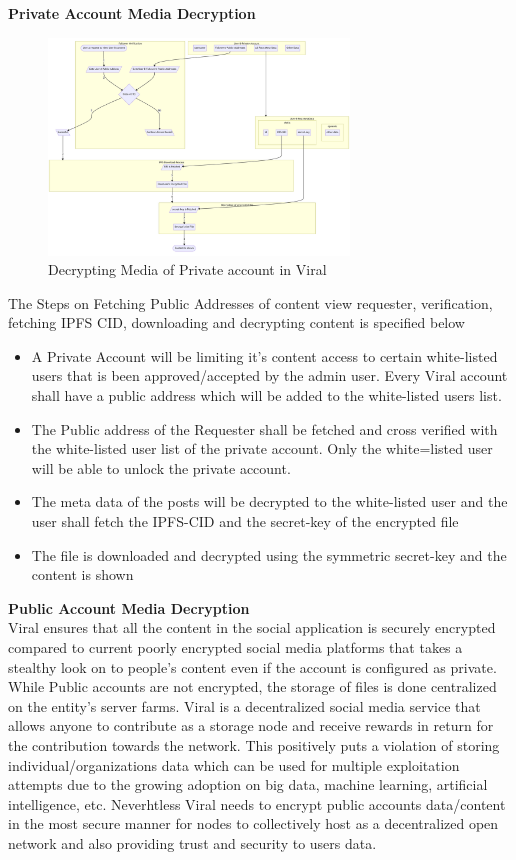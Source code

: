 \documentclass[10pt]{article}
\begin{document}
\textbf{Private Account Media Decryption}\\

\begin{figure}[H]
\begin{center}
\includegraphics[width=8cm]{decryption-private}
\caption{Decrypting Media of Private account in Viral}
\end{center}
\end{figure}

The Steps on Fetching Public Addresses of content view requester, verification, fetching IPFS CID, downloading and decrypting content is specified below
\begin{itemize}[leftmargin=+0.2in]
\item A Private Account will be limiting it's content access to certain white-listed users that is been approved/accepted by the admin user. Every Viral account shall have a public address which will be added to the white-listed users list.
\item The Public address of the Requester shall be fetched and cross verified with the white-listed user list of the private account. Only the white=listed user will be able to unlock the private account.
\item The meta data of the posts will be decrypted to the white-listed user and the user shall fetch the IPFS-CID and the secret-key of the encrypted file
\item The file is downloaded and decrypted using the symmetric secret-key and the content is shown
\end{itemize}


\textbf{Public Account Media Decryption}\\

Viral ensures that all the content in the social application is securely encrypted compared to current poorly encrypted social media platforms that takes a stealthy look on to people's content even if the account is configured as private. While Public accounts are not encrypted, the storage of files is done centralized on the entity's server farms. Viral is a decentralized social media service that allows anyone to contribute as a storage node and receive rewards in return for the contribution towards the network. This positively puts a violation of storing individual/organizations data which can be used for multiple exploitation attempts due to the growing adoption on big data, machine learning, artificial intelligence, etc.  Neverhtless Viral needs to encrypt public accounts data/content in the most secure manner for nodes to collectively host as a decentralized open network and also providing trust and security to users data.
\end{document}
